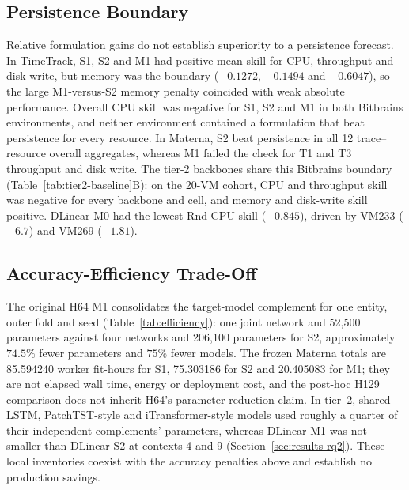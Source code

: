 \documentclass[5p,twocolumn]{elsarticle}
\begin{document}
\subsection{Persistence Boundary}
\label{sec:results-persistence}

Relative formulation gains do not establish superiority to a persistence
forecast. In TimeTrack, S1, S2 and M1 had positive mean skill for CPU,
throughput and disk write, but memory was the boundary ($-0.1272$, $-0.1494$
and $-0.6047$), so the large M1-versus-S2 memory penalty coincided with weak
absolute performance. Overall CPU skill was negative for S1, S2 and M1 in both
Bitbrains environments, and neither environment contained a formulation that
beat persistence for every resource. In Materna, S2 beat persistence in all 12
trace--resource overall aggregates, whereas M1 failed the check for T1 and T3
throughput and disk write.
The tier-2 backbones share this Bitbrains boundary
(Table~\ref{tab:tier2-baseline}B): on the 20-VM cohort, CPU and throughput
skill was negative for every backbone and cell, and memory and disk-write
skill positive. DLinear M0 had the lowest Rnd CPU skill ($-0.845$), driven
by VM233 ($-6.7$) and VM269 ($-1.81$).

\subsection{Accuracy-Efficiency Trade-Off}
\label{sec:results-efficiency}

The original H64 M1 consolidates the target-model complement for one entity,
outer fold and seed (Table~\ref{tab:efficiency}): one joint network and
52,500 parameters against four networks and 206,100 parameters for S2,
approximately $74.5\%$ fewer parameters and $75\%$ fewer models. The frozen
Materna totals are 85.594240 worker fit-hours for S1, 75.303186 for S2 and
20.405083 for M1; they are not elapsed wall time, energy or deployment cost,
and the post-hoc H129 comparison does not inherit H64's parameter-reduction
claim. In tier~2, shared LSTM, PatchTST-style and iTransformer-style models
used roughly a quarter of their independent complements' parameters, whereas
DLinear M1 was not smaller than DLinear S2 at contexts 4 and 9
(Section~\ref{sec:results-rq2}). These local inventories coexist with the
accuracy penalties above and establish no production savings.
\end{document}
